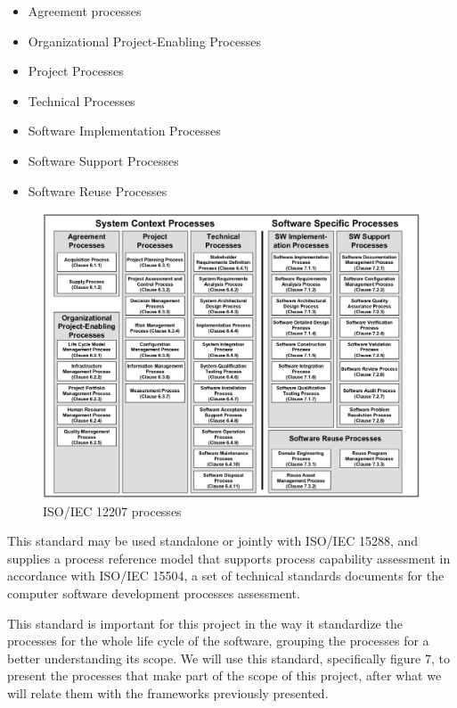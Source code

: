 \begin{itemize}
  \item Agreement processes
  \item Organizational Project-Enabling Processes
  \item Project Processes
  \item Technical Processes
  \item Software Implementation Processes
  \item Software Support Processes
  \item Software Reuse Processes 
\end{itemize}

 
\begin{figure}[t!]
\centering
\includegraphics[width=\textwidth]{img/ISO12207Processes.png}
\caption{ISO/IEC 12207 processes}
\end{figure}

This standard may be used standalone or jointly with ISO/IEC 15288, and supplies a process reference model that supports process capability assessment in accordance with ISO/IEC 15504, a set of technical standards documents for the computer software development processes assessment.\par
This standard is important for this project in the way it standardize the processes for the whole life cycle of the software, grouping the processes for a better understanding its scope. We will use this standard, specifically figure 7, to present the processes that make part of the scope of this project, after what we will relate them with the frameworks previously presented. 


